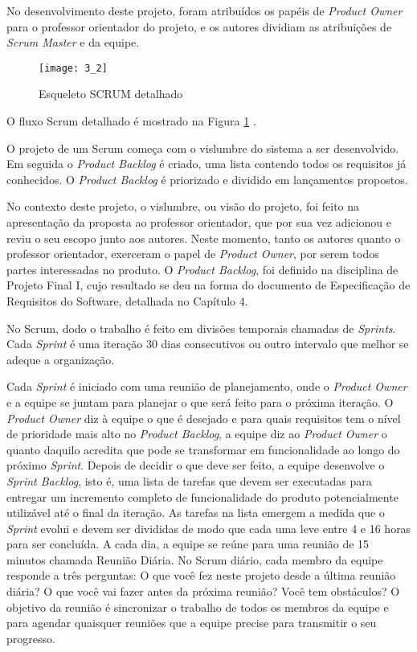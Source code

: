 No desenvolvimento deste projeto, foram atribuídos os papéis de \textit{Product Owner} para o professor orientador do projeto, e os autores dividiam as atribuições de \textit{Scrum Master} e da equipe. 

\begin{figure}[H]
    \centering
\texttt{[image: 3\_2]}
    \caption{Esqueleto SCRUM detalhado}
    \label{figura2}
\end{figure}

O fluxo Scrum detalhado é mostrado na Figura \ref{figura2} \cite{book:schwaber}.

O projeto de um Scrum começa com o vislumbre do sistema a ser desenvolvido. Em seguida o \textit{Product Backlog} é criado, uma lista contendo todos os requisitos já conhecidos. O \textit{Product Backlog} é priorizado e dividido em lançamentos propostos. 

No contexto deste projeto, o vislumbre, ou visão do projeto, foi feito na apresentação da proposta ao professor orientador, que por sua vez adicionou e reviu o seu escopo junto aos autores. Neste momento, tanto os autores quanto o professor orientador, exerceram o papel de \textit{Product Owner}, por serem todos partes interessadas no produto. O \textit{Product Backlog}, foi definido na disciplina de Projeto Final I, cujo resultado se deu na forma do documento de Especificação de Requisitos do Software, detalhada no Capítulo 4.

No Scrum, dodo o trabalho é feito em divisões temporais chamadas de \textit{Sprints}. Cada \textit{Sprint} é uma iteração 30 dias consecutivos ou outro intervalo que melhor se adeque a organização.

Cada \textit{Sprint} é iniciado com uma reunião de planejamento, onde o \textit{Product Owner} e a equipe se juntam para planejar o que será feito para o próxima iteração. O \textit{Product Owner} diz à equipe o que é desejado e para quais requisitos tem o nível de prioridade mais alto no \textit{Product Backlog}, a equipe diz ao \textit{Product Owner} o quanto daquilo acredita que pode se transformar em funcionalidade ao longo do próximo \textit{Sprint}.
Depois de decidir o que deve ser feito, a equipe desenvolve o \textit{Sprint Backlog}, isto é, uma lista de tarefas que devem ser executadas para entregar um incremento completo de funcionalidade do produto potencialmente utilizável até o final da iteração. As tarefas na lista emergem a medida que o \textit{Sprint} evolui e devem ser divididas de modo que cada uma leve entre 4 e 16 horas para ser concluída.
A cada dia, a equipe se reúne para uma reunião de 15 minutos chamada Reunião Diária. No Scrum diário, cada membro da equipe responde a três perguntas: O que você fez neste projeto desde a última reunião diária? O que você vai fazer antes da próxima reunião? Você tem obstáculos? O objetivo da reunião é sincronizar o trabalho de todos os membros da equipe e para agendar quaisquer reuniões que a equipe precise para transmitir o seu progresso.

